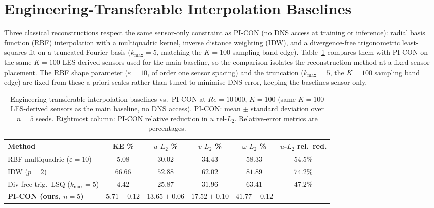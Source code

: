 \section{Engineering-Transferable Interpolation Baselines}
\label{app:fair_baselines}

Three classical reconstructions respect the same sensor-only constraint as PI-CON (no DNS access at training or inference): radial basis function (RBF) interpolation with a multiquadric kernel, inverse distance weighting (IDW), and a divergence-free trigonometric least-squares fit on a truncated Fourier basis ($k_{\max}=5$, matching the $K=100$ sampling band edge). Table~\ref{tab:fair_baselines} compares them with PI-CON on the same $K=100$ LES-derived sensors used for the main baseline, so the comparison isolates the reconstruction method at a fixed sensor placement. The RBF shape parameter ($\varepsilon=10$, of order one sensor spacing) and the truncation ($k_{\max}=5$, the $K=100$ sampling band edge) are fixed from these a-priori scales rather than tuned to minimise DNS error, keeping the baselines sensor-only.

\begin{table}[!htbp]
    \centering
    \caption{Engineering-transferable interpolation baselines vs.\ PI-CON at $Re=10\,000$, $K=100$ (same $K=100$ LES-derived sensors as the main baseline, no DNS access). PI-CON: mean $\pm$ standard deviation over $n=5$ seeds. Rightmost column: PI-CON relative reduction in $u$ rel-$L_2$. Relative-error metrics are percentages.}
    \label{tab:fair_baselines}
    \footnotesize
    \setlength{\tabcolsep}{3pt}
    \begin{tabular}{lccccc}
    \toprule
    \textbf{Method} & \textbf{KE \%} & \textbf{$u$ $L_2$ \%} & \textbf{$v$ $L_2$ \%} & \textbf{$\omega$ $L_2$ \%} & \textbf{$u$-$L_2$ rel.\ red.} \\
    \midrule
    RBF multiquadric ($\varepsilon=10$)   & $5.08$  & $30.02$ & $34.43$ & $58.33$ & $54.5\%$ \\
    IDW ($p=2$)                           & $66.66$ & $52.88$ & $62.02$ & $81.89$ & $74.2\%$ \\
    Div-free trig.\ LSQ ($k_{\max}=5$)    & $4.42$  & $25.87$ & $31.96$ & $63.41$ & $47.2\%$ \\
    \midrule
    \textbf{PI-CON (ours, $n=5$)}         & $5.71 {\pm} 0.12$ & $\mathbf{13.65 {\pm} 0.06}$ & $\mathbf{17.52 {\pm} 0.10}$ & $\mathbf{41.77 {\pm} 0.12}$ & -- \\
    \bottomrule
    \end{tabular}
\end{table}

